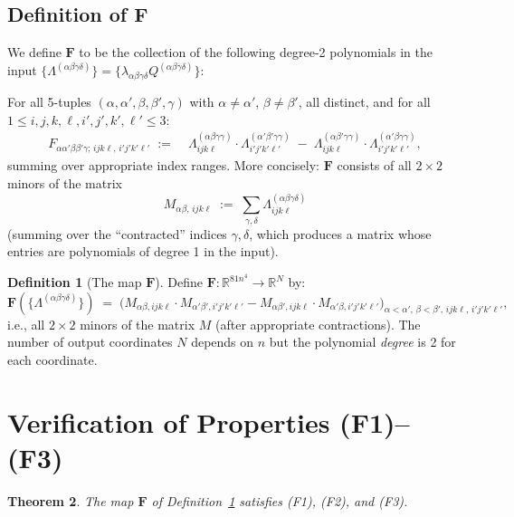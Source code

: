 \documentclass[12pt]{article}
\newtheorem{theorem}{Theorem}
\theoremstyle{definition}
\newtheorem{definition}[theorem]{Definition}
\theoremstyle{remark}
\begin{document}
\subsection{Definition of $\mathbf{F}$}

We define $\mathbf{F}$ to be the collection of the following degree-2 polynomials
in the input $\{\Lambda^{(\alpha\beta\gamma\delta)}\} =
\{\lambda_{\alpha\beta\gamma\delta}Q^{(\alpha\beta\gamma\delta)}\}$:

For all 5-tuples $(\alpha,\alpha',\beta,\beta',\gamma)$ with
$\alpha\neq\alpha'$, $\beta\neq\beta'$, all distinct, and for all
$1\leq i,j,k,\ell,i',j',k',\ell'\leq 3$:
\begin{align}
  F_{\alpha\alpha'\beta\beta'\gamma;\,ij k\ell,\,i'j'k'\ell'}
  \;:=\;
  &\Lambda^{(\alpha\beta\gamma\gamma)}_{ijk\ell}\cdot
   \Lambda^{(\alpha'\beta'\gamma\gamma)}_{i'j'k'\ell'}
  \;-\;
   \Lambda^{(\alpha\beta'\gamma\gamma)}_{ijk\ell}\cdot
   \Lambda^{(\alpha'\beta\gamma\gamma)}_{i'j'k'\ell'}, \label{eq:F}
\end{align}
summing over appropriate index ranges.  More concisely: $\mathbf{F}$ consists
of all $2\times 2$ minors of the matrix
\[
  M_{\alpha\beta,\,ijk\ell}
  \;:=\;
  \sum_{\gamma,\delta}\Lambda^{(\alpha\beta\gamma\delta)}_{ijk\ell}
\]
(summing over the ``contracted'' indices $\gamma,\delta$, which produces a
matrix whose entries are polynomials of degree 1 in the input).

\begin{definition}[The map $\mathbf{F}$]\label{def:F}
Define $\mathbf{F}:\mathbb{R}^{81n^4}\to\mathbb{R}^N$ by:
\[
  \mathbf{F}(\{\Lambda^{(\alpha\beta\gamma\delta)}\})
  \;=\;
  \bigl(M_{\alpha\beta,ijk\ell}\cdot M_{\alpha'\beta',i'j'k'\ell'}
  - M_{\alpha\beta',ijk\ell}\cdot M_{\alpha'\beta,i'j'k'\ell'}\bigr)
  _{\alpha<\alpha',\,\beta<\beta',\,ijk\ell,\,i'j'k'\ell'},
\]
i.e., all $2\times 2$ minors of the matrix $M$ (after appropriate contractions).
The number of output coordinates $N$ depends on $n$ but the polynomial
\emph{degree} is 2 for each coordinate.
\end{definition}

\section{Verification of Properties (F1)--(F3)}

\begin{theorem}\label{thm:main}
The map $\mathbf{F}$ of Definition~\ref{def:F} satisfies (F1), (F2), and (F3).
\end{theorem}
\end{document}
